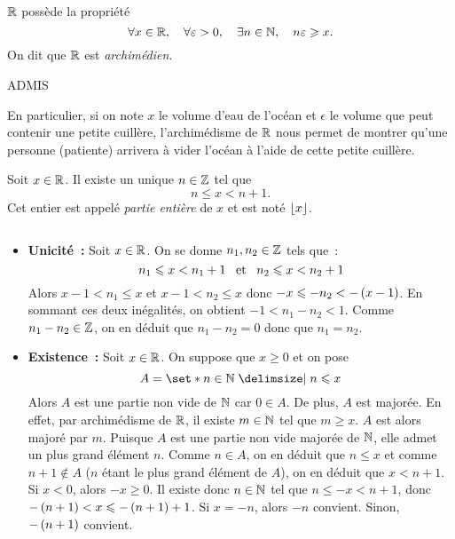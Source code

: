 \documentclass{magnoliaold}
\begin{document}
\begin{proposition}
$\mathbb{R}$ possède la propriété
\[\forall x\in\mathbb{R} ,\quad \forall \varepsilon>0 ,\quad \exists n\in\mathbb{N} ,\quad n\varepsilon \geqslant x.\]
On dit que $\mathbb{R}$ est \emph{archimédien}.
\end{proposition}

\begin{preuve}
ADMIS

\end{preuve}

\begin{remarqueUnique}
\remarque En particulier, si on note $x$ le volume d'eau de l'océan et $\epsilon$ le volume
que peut contenir une petite cuillère, l'archimédisme de $\mathbb{R}$ nous permet de montrer qu'une
personne (patiente) arrivera à vider l'océan à l'aide de cette petite cuillère.
\end{remarqueUnique}




\begin{definition}[utile=-3]
Soit $x\in\mathbb{R}$. Il existe un unique $n\in\mathbb{Z}$ tel que
\[n\leq x<n+1.\]
Cet entier est appelé \emph{partie entière} de $x$ et est noté $\left\lfloor x\right\rfloor$.
\end{definition}

\begin{preuve}
$\quad$
\begin{itemize}
\item \textbf{Unicité~:}
  Soit $x\in\mathbb{R}$. On se donne $n_1,n_2\in\mathbb{Z}$ tels que~:
  \[n_1\leqslant x<n_1+1 \quad\!\text{et}\quad\! n_2\leqslant x<n_2+1\]
  Alors $x-1<n_1\leq x$ et $x-1<n_2\leq x$ donc $-x\leqslant -n_2<-\left(x-1\right)$. En
  sommant ces deux inégalités, on obtient $-1<n_1-n_2<1$. Comme $n_1-n_2\in\mathbb{Z}$,
  on en déduit que $n_1-n_2=0$ donc que $n_1=n_2$.
\item \textbf{Existence~:}
  Soit $x\in\mathbb{R}$. On suppose que $x\geq 0$ et on pose
  \[A=\enstq{n\in\N}{n\leq x}\]
  Alors $A$ est une partie non vide de $\mathbb{N}$ car $0\in A$. De plus, $A$ est
  majorée.
  En effet, par archimédisme de $\mathbb{R}$, il existe $m\in\mathbb{N}$ tel que $m\geq x$. $A$
  est alors majoré par $m$. Puisque $A$ est une partie non vide majorée de $\mathbb{N}$,
  elle admet un plus grand élément $n$. Comme $n\in A$, on en déduit que
  $n\leq x$ et comme $n+1\not\in A$ ($n$ étant le plus grand élément de $A$), on
  en déduit que $x<n+1$.\\
  Si $x<0$, alors $-x\geq 0$. Il existe donc $n\in\mathbb{N}$ tel que
  $n\leq -x<n+1$, donc $-\left(n+1\right)<x\leqslant -\left(n+1\right)+1$. Si $x=-n$, alors $-n$
  convient. Sinon, $-\left(n+1\right)$ convient.
\end{itemize}
\end{preuve}
\end{document}

